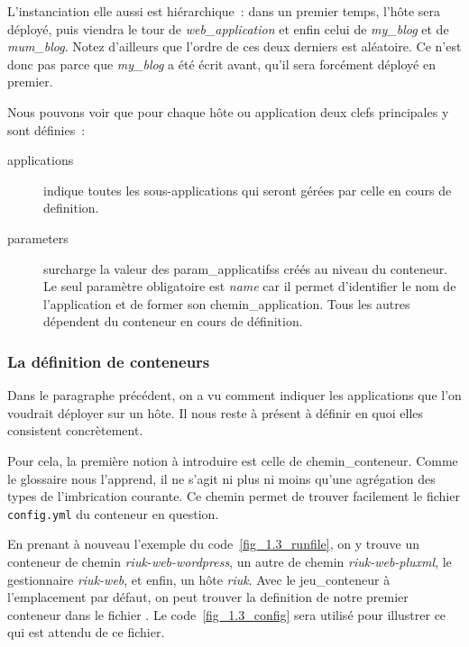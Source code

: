 L'\gls{instanciation} elle aussi est hiérarchique~: dans un premier temps, l'hôte sera déployé, puis viendra le tour de \emph{web\_application} et enfin celui de \emph{my\_blog} et de \emph{mum\_blog}.
Notez d'ailleurs que l'ordre de ces deux derniers est aléatoire.
Ce n'est donc pas parce que \emph{my\_blog} a été écrit avant, qu'il sera forcément déployé en premier.

Nous pouvons voir que pour chaque hôte ou application deux clefs principales y sont définies~:
\begin{description}
	\item[applications] indique toutes les \glspl{sous-application} qui seront gérées par celle en cours de \gls{definition}.
	\item[parameters] surcharge la valeur des \glspl{param_applicatifs} créés au niveau du conteneur.
		Le seul paramètre obligatoire est \emph{name} car il permet d'identifier le nom de l'application et de former son \gls{chemin_application}.
		Tous les autres dépendent du conteneur en cours de définition.
\end{description}

\subsubsection{La définition de conteneurs}

Dans le paragraphe précédent, on a vu comment indiquer les \glspl{application} que l'on voudrait déployer sur un hôte.
Il nous reste à présent à définir en quoi elles consistent concrètement.

Pour cela, la première notion à introduire est celle de \gls{chemin_conteneur}.
Comme le glossaire nous l'apprend, il ne s'agit ni plus ni moins qu'une agrégation des types de l'\gls{imbrication} courante.
Ce chemin permet de trouver facilement le fichier {\tt config.yml} du conteneur en question.

En prenant à nouveau l'exemple du code~\ref{fig_1.3_runfile}, on y trouve un conteneur de chemin \emph{riuk-web-wordpress}, un autre de chemin \emph{riuk-web-pluxml}, le gestionnaire \emph{riuk-web}, et enfin, un hôte \emph{riuk}.
Avec le \gls{jeu_conteneur} à l'emplacement par défaut, on peut trouver la \gls{definition} de notre premier conteneur dans le fichier .
Le code~\ref{fig_1.3_config} sera utilisé pour illustrer ce qui est attendu de ce fichier.



